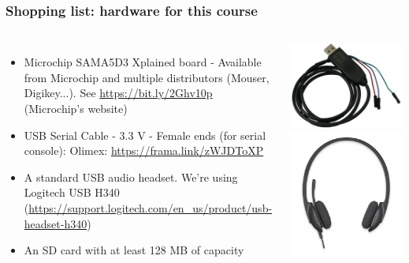 \begin{frame}
\frametitle{Shopping list: hardware for this course}
  \begin{columns}
    \footnotesize
    \begin{itemize}
      \item Microchip SAMA5D3 Xplained board - Available from Microchip and
	    multiple distributors (Mouser, Digikey...).
	    See \url{https://bit.ly/2Ghv10p} (Microchip's website)
      \item USB Serial Cable - 3.3 V - Female ends (for serial console):
	    Olimex: \url{https://frama.link/zWJDToXP} \\
      \item A standard USB audio headset. We're using Logitech USB H340
            (\url{https://support.logitech.com/en_us/product/usb-headset-h340})
      \item An SD card with at least 128 MB of capacity
    \end{itemize}
    \includegraphics[height=0.20\textheight]{common/usb-serial-cable-female.png} \\
    \vspace{1cm}
    \includegraphics[height=0.15\textheight]{common/logitech-h340.png} \\

\end{columns}
\end{frame}
